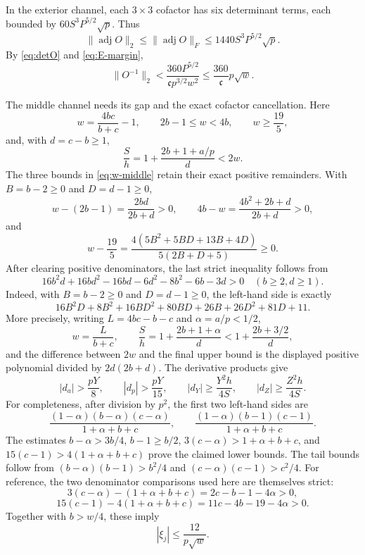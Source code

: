 In the exterior channel, each \(3\times3\) cofactor has six determinant terms,
each bounded by \(60S^3P^{5/2}\sqrt p\). Thus
\[
 \|\operatorname{adj}O\|_2
 \le\|\operatorname{adj}O\|_F
 \le1440S^3P^{5/2}\sqrt p.
\]
By \eqref{eq:detO} and \eqref{eq:E-margin},
\[
 \|O^{-1}\|_2
 <\frac{360P^{5/2}}{\mathfrak c p^{3/2}w^2}
 \le\frac{360}{\mathfrak c}p\sqrt w.
\]

The middle channel needs its gap and the exact cofactor cancellation. Here
\begin{equation}\label{eq:w-middle}
 w=\frac{4bc}{b+c}-1,\qquad2b-1\le w<4b,\qquad w\ge\frac{19}{5},
\end{equation}
and, with \(d=c-b\ge1\),
\begin{equation}\label{eq:S-h}
 \frac Sh=1+\frac{2b+1+a/p}{d}<2w.
\end{equation}
The three bounds in \eqref{eq:w-middle} retain their exact positive
remainders.  With \(B=b-2\ge0\) and \(D=d-1\ge0\),
\[
 w-(2b-1)=\frac{2bd}{2b+d}>0,
 \qquad
 4b-w=\frac{4b^2+2b+d}{2b+d}>0,
\]
and
\[
 w-\frac{19}{5}
 =\frac{4(5B^2+5BD+13B+4D)}{5(2B+D+5)}\ge0.
\]
After clearing positive denominators, the last strict inequality follows from
\[
 16b^2d+16bd^2-16bd-6d^2-8b^2-6b-3d>0
 \quad(b\ge2,d\ge1).
\]
Indeed, with \(B=b-2\ge0\) and \(D=d-1\ge0\), the left-hand side is exactly
\[
 16B^2D+8B^2+16BD^2+80BD+26B+26D^2+81D+11.
\]
More precisely, writing \(L=4bc-b-c\) and \(\alpha=a/p<1/2\),
\[
 w=\frac{L}{b+c},\qquad
 \frac Sh=1+\frac{2b+1+\alpha}{d}
 <1+\frac{2b+3/2}{d},
\]
and the difference between \(2w\) and the final upper bound is the displayed
positive polynomial divided by \(2d(2b+d)\).
The derivative products give
\[
 |d_a|>\frac{pY}{8},\qquad |d_p|>\frac{pY}{15},\qquad
 |d_Y|\ge\frac{Y^2h}{4S},\qquad
 |d_Z|\ge\frac{Z^2h}{4S}.
\]
For completeness, after division by \(p^2\), the first two left-hand sides are
\[
 \frac{(1-\alpha)(b-\alpha)(c-\alpha)}{1+\alpha+b+c},\qquad
 \frac{(1-\alpha)(b-1)(c-1)}{1+\alpha+b+c}.
\]
The estimates \(b-\alpha>3b/4\), \(b-1\ge b/2\),
\(3(c-\alpha)>1+\alpha+b+c\), and
\(15(c-1)>4(1+\alpha+b+c)\) prove the claimed lower bounds. The tail
bounds follow from
\((b-\alpha)(b-1)>b^2/4\) and
\((c-\alpha)(c-1)>c^2/4\).
For reference, the two denominator comparisons used here are themselves
strict:
\[
 3(c-\alpha)-(1+\alpha+b+c)=2c-b-1-4\alpha>0,
\]
\[
 15(c-1)-4(1+\alpha+b+c)=11c-4b-19-4\alpha>0.
\]
Together with \(b>w/4\), these imply
\begin{equation}\label{eq:xi-middle}
 |\xi_j|\le\frac{12}{p\sqrt w}.
\end{equation}

